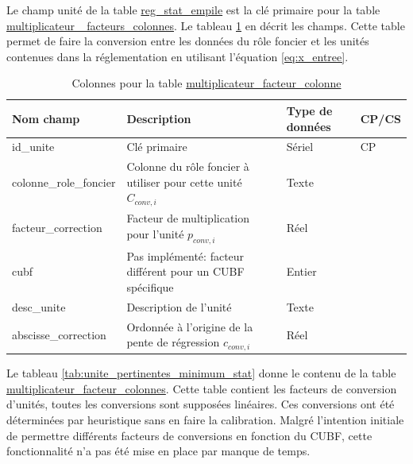             Le champ unité de la table \underline{reg\_stat\_empile} est la clé primaire pour la table \uline{multiplicateur\_ facteurs\_colonnes}. Le tableau \ref{tab:definition_unite} en décrit les champs. Cette table permet de faire la conversion entre les données du rôle foncier et les unités contenues dans la réglementation en utilisant l'équation \ref{eq:x_entree}.\par
            \begin{table}[H]
                \caption{Colonnes pour la table \underline{multiplicateur\_facteur\_colonne}}
            \label{tab:definition_unite}
            \centering
            \begin{tabular}{m{}|m{}m{}m{}}
                    \hline
                    Nom champ & Description & Type de données & CP/CS  \\
                    \hline
                    id\_unite & Clé primaire  & Sériel & CP \\  
                    colonne\_role\_foncier & Colonne du rôle foncier à utiliser pour cette unité $C_{conv,i}$ & Texte & \\
                    facteur\_correction & Facteur de multiplication pour l'unité $p_{conv,i}$ & Réel & \\
                    cubf & Pas implémenté: facteur différent pour un CUBF spécifique & Entier & \\
                    desc\_unite & Description de l'unité & Texte & \\
                    abscisse\_correction & Ordonnée à l'origine de la pente de régression $c_{conv,i}$& Réel &  \\
                    \hline
            \end{tabular}
            
            \end{table}   
            \clearpage
            Le tableau \ref{tab:unite_pertinentes_minimum_stat} donne  le contenu de la table \ul{multiplicateur\_facteur\_colonnes}. Cette table contient les facteurs de conversion d'unités, toutes les conversions sont supposées linéaires.  Ces conversions ont été déterminées par heuristique sans en faire la calibration. Malgré l'intention initiale de permettre différents facteurs de conversions en fonction du \ac{CUBF}, cette fonctionnalité n'a pas été mise en place par manque de temps. \par
